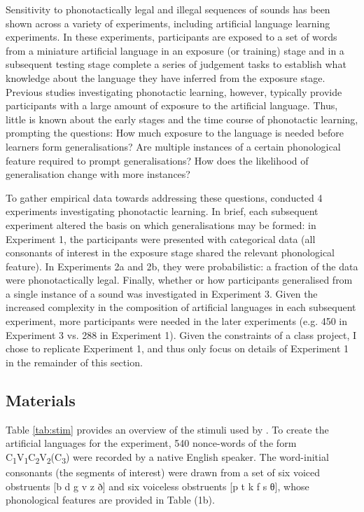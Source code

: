 \documentclass[letterpaper,11pt]{article}
\begin{document}
Sensitivity to phonotactically legal and illegal sequences of sounds has been shown across a variety of experiments, including artificial language learning experiments.
In these experiments, participants are exposed to a set of words from a miniature artificial language in an exposure (or training) stage and in a subsequent testing stage complete a series of judgement tasks to establish what knowledge about the language they have inferred from the exposure stage.
Previous studies investigating phonotactic learning, however, typically provide participants with a large amount of exposure to the artificial language.
Thus, little is known about the early stages and the time course of phonotactic learning, prompting the questions: How much exposure to the language is needed before learners form generalisations? Are multiple instances of a certain phonological feature required to prompt generalisations? How does the likelihood of generalisation change with more instances?

To gather empirical data towards addressing these questions, \textcite{linzen2017rapid} conducted 4 experiments investigating phonotactic learning.
In brief, each subsequent experiment altered the basis on which generalisations may be formed: in Experiment 1, the participants were presented with categorical data (all consonants of interest in the exposure stage shared the relevant phonological feature).
In Experiments 2a and 2b, they were probabilistic: a fraction of the data were phonotactically legal. 
Finally, whether or how participants generalised from a single instance of a sound was investigated in Experiment 3.
Given the increased complexity in the composition of artificial languages in each subsequent experiment, more participants were needed in the later experiments (e.g. 450 in Experiment 3 vs. 288 in Experiment 1).
Given the constraints of a class project, I chose to replicate Experiment 1, and thus only focus on details of Experiment 1 in the remainder of this section.

\newpage

\subsection{Materials}

Table \ref{tab:stim} provides an overview of the stimuli used by \textcite{linzen2017rapid}.
To create the artificial languages for the experiment, 540 nonce-words of the form C\textsubscript{1}V\textsubscript{1}C\textsubscript{2}V\textsubscript{2}(C\textsubscript{3}) were recorded by a native English speaker.
The word-initial consonants (the segments of interest) were drawn from a set of six voiced obstruents [b d g v z ð] and six voiceless obstruents [p t k f s θ], whose phonological features are provided in Table (1b).
\end{document}
